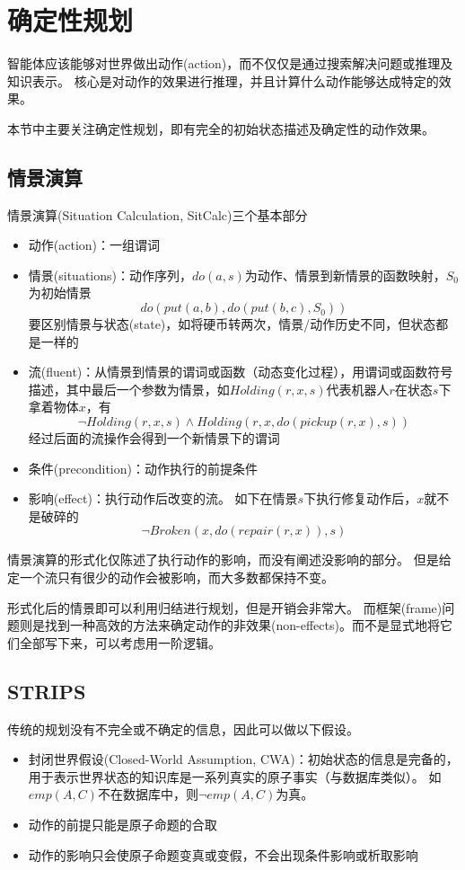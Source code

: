 
\section{确定性规划}

智能体应该能够对世界做出动作(action)，而不仅仅是通过搜索解决问题或推理及知识表示。
核心是对动作的效果进行推理，并且计算什么动作能够达成特定的效果。

本节中主要关注确定性规划，即有完全的初始状态描述及确定性的动作效果。

\subsection{情景演算}
情景演算(Situation Calculation, SitCalc)三个基本部分
\begin{itemize}
	\item 动作(action)：一组谓词
	\item 情景(situations)：动作序列，$do(a,s)$为动作、情景到新情景的函数映射，$S_0$为初始情景
	\[do(put(a,b),do(put(b,c),S_0))\]
	要区别情景与状态(state)，如将硬币转两次，情景/动作历史不同，但状态都是一样的
	\item 流(fluent)：从情景到情景的谓词或函数（动态变化过程），用谓词或函数符号描述，其中最后一个参数为情景，如$Holding(r,x,s)$代表机器人$r$在状态$s$下拿着物体$x$，有
	\[\lnot Holding(r,x,s)\land Holding(r,x,do(pickup(r,x),s))\]
	经过后面的流操作会得到一个新情景下的谓词
	\item 条件(precondition)：动作执行的前提条件
	\item 影响(effect)：执行动作后改变的流。 %
	如下在情景$s$下执行修复动作后，$x$就不是破碎的
	\[\lnot Broken(x,do(repair(r,x)),s)\]
\end{itemize}

情景演算的形式化仅陈述了执行动作的影响，而没有阐述没影响的部分。
但是给定一个流只有很少的动作会被影响，而大多数都保持不变。

形式化后的情景即可以利用归结进行规划，但是开销会非常大。
而框架(frame)问题则是找到一种高效的方法来确定动作的非效果(non-effects)。而不是显式地将它们全部写下来，可以考虑用一阶逻辑。

\subsection{STRIPS}
传统的规划没有不完全或不确定的信息，因此可以做以下假设。
\begin{itemize}
	\item 封闭世界假设(Closed-World Assumption, CWA)：初始状态的信息是完备的，用于表示世界状态的知识库是一系列真实的原子事实（与数据库类似）。
	如$emp(A,C)$不在数据库中，则$\lnot emp(A,C)$为真。
	\item 动作的前提只能是原子命题的合取
	\item 动作的影响只会使原子命题变真或变假，不会出现条件影响或析取影响
\end{itemize}

